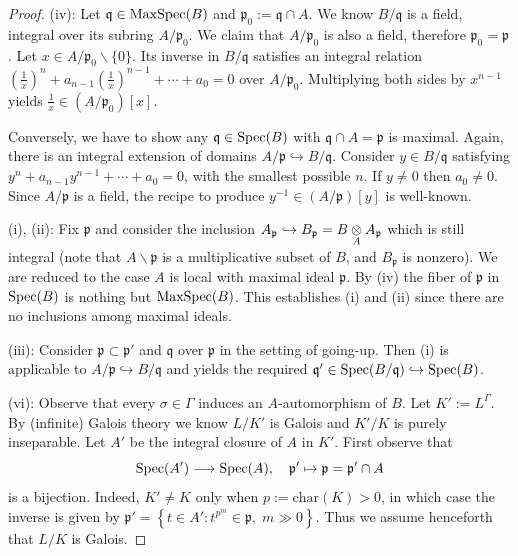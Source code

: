 \begin{proof}
	(iv): Let $\mathfrak{q} \in \operatorname{MaxSpec}(B)$ and $\mathfrak{p}_0 := \mathfrak{q} \cap A$. We know $B/\mathfrak{q}$ is a field, integral over its subring $A/\mathfrak{p}_0$. We claim that $A/\mathfrak{p}_0$ is also a field, therefore $\mathfrak{p}_0 = \mathfrak{p}$. Let $x \in A/\mathfrak{p}_0 \smallsetminus \{0\}$. Its inverse in $B/\mathfrak{q}$ satisfies an integral relation $(\frac{1}{x})^n + a_{n-1} (\frac{1}{x})^{n-1} + \cdots + a_0 = 0$ over $A/\mathfrak{p}_0$. Multiplying both sides by $x^{n-1}$ yields $\frac{1}{x} \in (A/\mathfrak{p}_0)[x]$.
	
	Conversely, we have to show any $\mathfrak{q} \in \operatorname{Spec}(B)$ with $\mathfrak{q} \cap A = \mathfrak{p}$ is maximal. Again, there is an integral extension of domains $A/\mathfrak{p} \hookrightarrow B/\mathfrak{q}$. Consider $y \in B/\mathfrak{q}$ satisfying $y^n + a_{n-1} y^{n-1} + \cdots + a_0 = 0$, with the smallest possible $n$. If $y \neq 0$ then $a_0 \neq 0$. Since $A/\mathfrak{p}$ is a field, the recipe to produce $y^{-1} \in (A/\mathfrak{p})[y]$ is well-known.
	
	(i), (ii): Fix $\mathfrak{p}$ and consider the inclusion $A_{\mathfrak{p}} \hookrightarrow B_{\mathfrak{p}} = B \underset{A}{\otimes} A_{\mathfrak{p}}$ which is still integral (note that $A \smallsetminus \mathfrak{p}$ is a multiplicative subset of $B$, and $B_{\mathfrak{p}}$ is nonzero). We are reduced to the case $A$ is local with maximal ideal $\mathfrak{p}$. By (iv) the fiber of $\mathfrak{p}$ in $\operatorname{Spec}(B)$ is nothing but $\operatorname{MaxSpec}(B)$. This establishes (i) and (ii) since there are no inclusions among maximal ideals.
	
	(iii): Consider $\mathfrak{p} \subset \mathfrak{p}'$ and $\mathfrak{q}$ over $\mathfrak{p}$ in the setting of going-up. Then (i) is applicable to $A/\mathfrak{p} \hookrightarrow B/\mathfrak{q}$ and yields the required $\mathfrak{q}' \in \operatorname{Spec}(B/\mathfrak{q}) \hookrightarrow \operatorname{Spec}(B)$.
	
	(vi): Observe that every $\sigma \in \Gamma$ induces an $A$-automorphism of $B$. Let $K' := L^\Gamma$. By (infinite) Galois theory we know $L/K'$ is Galois and $K'/K$ is purely inseparable. Let $A'$ be the integral closure of $A$ in $K'$. First observe that 
	\[ \operatorname{Spec}(A') \longrightarrow \operatorname{Spec}(A), \quad \mathfrak{p}' \mapsto \mathfrak{p} = \mathfrak{p}' \cap A \]
	is a bijection. Indeed, $K' \neq K$ only when $p := \text{char}(K) > 0$, in which case the inverse is given by $\mathfrak{p}' = \left\{t \in A': t^{p^m} \in \mathfrak{p}, \; m \gg 0 \right\}$. Thus we assume henceforth that $L/K$ is Galois.
	

\end{proof}

